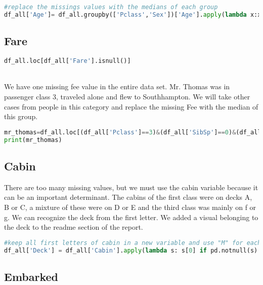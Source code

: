 \documentclass[onecolumn]{article}
\begin{document}
\begin{lstlisting}[language=Python, caption=  age ] 
#replace the missings values with the medians of each group
df_all['Age']= df_all.groupby(['Pclass','Sex'])['Age'].apply(lambda x:x.fillna(x.median()))
\end{lstlisting}

\subsection{Fare}
\begin{lstlisting}[language=Python, caption=  fare ] 
df_all.loc[df_all['Fare'].isnull()]   
\end{lstlisting}
\\

We have one missing fee value in the entire data set. Mr. Thomas was in passenger class 3, traveled alone and flew to Southhampton. We will take other cases from people in this category and replace the missing Fee with the median of this group.

\begin{lstlisting}[language=Python, caption=  loc cases which are similar to Mr.Thomas and use the median of fare to replace  the missing for his data set ] 
mr_thomas=df_all.loc[(df_all['Pclass']==3)&(df_all['SibSp']==0)&(df_all['Embarked']=='S')]['Fare'].median()
print(mr_thomas)
\end{lstlisting}
\subsection{Cabin}

There are too many missing values, but we must use the cabin variable because it can be an important determinant. The cabins of the first class were on decks A, B or C, a mixture of these were on D or E and the third class was mainly on f or g. We can recognize the deck from the first letter.
We added a visual belonging to the deck to the readme section of the report.

\begin{lstlisting}[language=Python, caption=  cabin missing values] 
#keep all first letters of cabin in a new variable and use "M" for each missing
df_all['Deck'] = df_all['Cabin'].apply(lambda s: s[0] if pd.notnull(s) else 'M' )
\end{lstlisting}
\subsection{Embarked}
\end{document}
